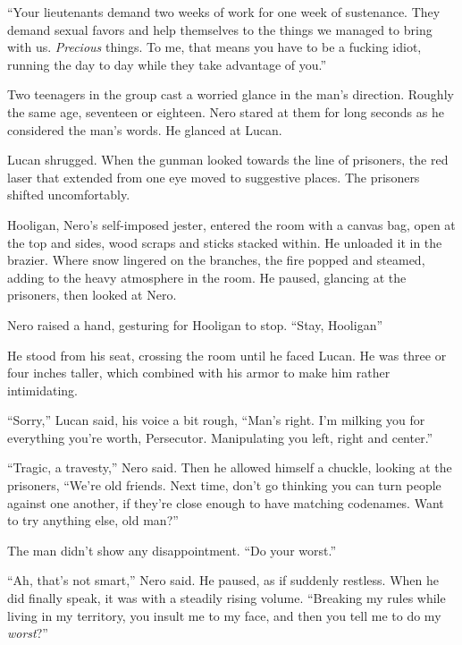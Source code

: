 ``Your lieutenants demand two weeks of work for one week of sustenance.  They demand sexual favors and help themselves to the things we managed to bring with us.  \emph{Precious} things.  To me, that means you have to be a fucking idiot, running the day to day while they take advantage of you.''



Two teenagers in the group cast a worried glance in the man's direction.  Roughly the same age, seventeen or eighteen.  Nero stared at them for long seconds as he considered the man's words.  He glanced at Lucan.



Lucan shrugged.  When the gunman looked towards the line of prisoners, the red laser that extended from one eye moved to suggestive places.  The prisoners shifted uncomfortably.



Hooligan, Nero's self-imposed jester, entered the room with a canvas bag, open at the top and sides, wood scraps and sticks stacked within.  He unloaded it in the brazier.  Where snow lingered on the branches, the fire popped and steamed, adding to the heavy atmosphere in the room.  He paused, glancing at the prisoners, then looked at Nero.



Nero raised a hand, gesturing for Hooligan to stop.  ``Stay, Hooligan''



He stood from his seat, crossing the room until he faced Lucan.  He was three or four inches taller, which combined with his armor to make him rather intimidating.



``Sorry,'' Lucan said, his voice a bit rough, ``Man's right.  I'm milking you for everything you're worth, Persecutor.  Manipulating you left, right and center.''



``Tragic, a travesty,'' Nero said.  Then he allowed himself a chuckle, looking at the prisoners, ``We're old friends.  Next time, don't go thinking you can turn people against one another, if they're close enough to have matching codenames.  Want to try anything else, old man?''



The man didn't show any disappointment.  ``Do your worst.''



``Ah, that's not smart,'' Nero said.  He paused, as if suddenly restless.  When he did finally speak, it was with a steadily rising volume.  ``Breaking my rules while living in my territory, you insult me to my face, and then you tell me to do my \emph{worst}?''



